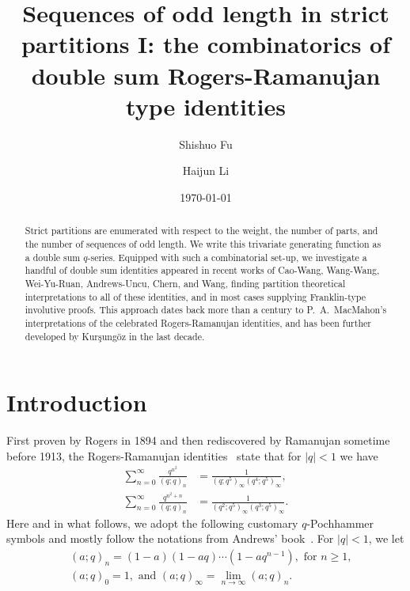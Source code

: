 \documentclass[11pt,reqno]{amsart}
\numberwithin{equation}{section}
\theoremstyle{plain}
\theoremstyle{definition}
\newcommand{\abs}[1]{\left|#1\right|}
\begin{document}
\title[Sequences of odd length in strict partitions I]{Sequences of odd length in strict partitions I: the combinatorics of double sum Rogers-Ramanujan type identities}

\author[S. Fu]{Shishuo Fu}
\address[Shishuo Fu]{College of Mathematics and Statistics, Chongqing University, Chongqing 401331, P.R. China}

\author[H. Li]{Haijun Li}
\address[Haijun Li]{College of Mathematics and Statistics, Chongqing University, Chongqing 401331, P.R. China}

\date{\today}

\begin{abstract}
Strict partitions are enumerated with respect to the weight, the number of parts, and the number of sequences of odd length. We write this trivariate generating function as a double sum $q$-series. Equipped with such a combinatorial set-up, we investigate a handful of double sum identities appeared in recent works of Cao-Wang, Wang-Wang, Wei-Yu-Ruan, Andrews-Uncu, Chern, and Wang, finding partition theoretical interpretations to all of these identities, and in most cases supplying Franklin-type involutive proofs. This approach dates back more than a century to P.~A.~MacMahon's interpretations of the celebrated Rogers-Ramanujan identities, and has been further developed by Kur\c{s}ung\"{o}z in the last decade.
\end{abstract}




\maketitle


\section{Introduction}

First proven by Rogers in 1894 and then rediscovered by Ramanujan sometime before 1913, the Rogers-Ramanujan identities~\cite[Chap.~19]{HW08} state that for $\abs{q}<1$ we have 
\begin{align}\label{id:RR1}
\sum_{n=0}^{\infty}\frac{q^{n^2}}{(q;q)_n} &=\frac{1}{(q;q^5)_{\infty}(q^4;q^5)_{\infty}},\\
\label{id:RR2}
\sum_{n=0}^{\infty}\frac{q^{n^2+n}}{(q;q)_n} &=\frac{1}{(q^2;q^5)_{\infty}(q^3;q^5)_{\infty}}.
\end{align}
Here and in what follows, we adopt the following customary $q$-Pochhammer symbols and mostly follow the notations from Andrews' book~\cite{andtp}. For $\abs{q}<1$, we let
\begin{align*}
& (a;q)_n=(1-a)(1-aq)\cdots(1-aq^{n-1}), \text{ for $n\ge 1$,}\\
& (a;q)_0=1,\text{ and } (a;q)_{\infty}=\lim_{n\to\infty}(a;q)_n.
\end{align*}
\end{document}
